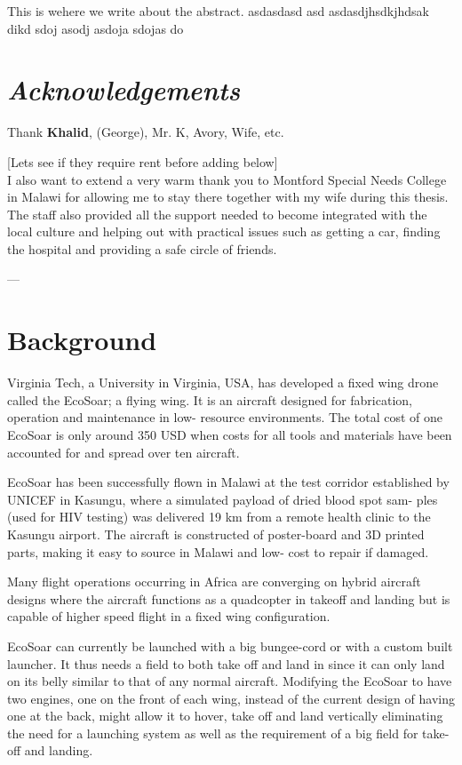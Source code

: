 \documentclass{article}
\begin{document}
\abstract
This is wehere we write about the abstract.
asdasdasd
asd
asdasdjhsdkjhdsak dikd  sdoj asodj asdoja sdojas do

\newpage
\section*{\textit{Acknowledgements}}

Thank \textbf{Khalid}, (George), Mr. K, Avory, Wife, etc.

[Lets see if they require rent before adding below]\\
I also want to extend a very warm thank you to Montford Special Needs College in Malawi for allowing me to stay there together with my wife during this thesis.
The staff also provided all the support needed to become integrated with the local culture and helping out with practical issues such as getting a car, finding the hospital and providing a safe circle of friends.

\newpage

\tableofcontents

\newpage

\newpage



---

\section{Background}
Virginia Tech, a University in Virginia, USA, has developed a fixed wing drone called the EcoSoar; a flying wing.
It is an aircraft designed for fabrication, operation and maintenance in low-
resource environments.
The total cost of one EcoSoar is only around 350 USD when costs for all tools and materials have been accounted for and spread over ten aircraft.

EcoSoar has been successfully flown in Malawi at
the test corridor established by UNICEF in Kasungu,
where a simulated payload of dried blood spot sam-
ples (used for HIV testing) was delivered 19 km from
a remote health clinic to the Kasungu airport. The
aircraft is constructed of poster-board and 3D printed
parts, making it easy to source in Malawi and low-
cost to repair if damaged.

Many flight operations occurring in Africa are converging on hybrid aircraft designs where the aircraft functions as a quadcopter in takeoff and landing but is capable of higher speed flight in a fixed wing configuration.

EcoSoar can currently be launched with a big bungee-cord or with a custom built launcher. It thus needs a field to both take off and land in since it can only land on its belly similar to that of any normal aircraft.
Modifying the EcoSoar to have two engines, one on the front of each wing, instead of the current design of having one at the back, might allow it to hover, take off and land vertically eliminating the need for a launching system as well as the requirement of a big field for take-off and landing.
\end{document}
